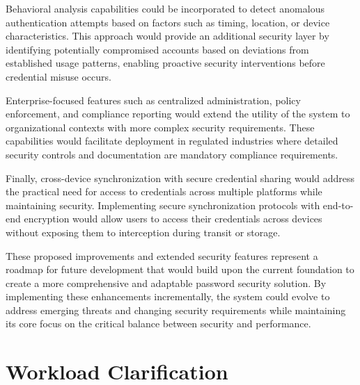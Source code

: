 \documentclass[11pt,a4paper]{article}
\begin{document}
Behavioral analysis capabilities could be incorporated to detect anomalous authentication attempts based on factors such as timing, location, or device characteristics. This approach would provide an additional security layer by identifying potentially compromised accounts based on deviations from established usage patterns, enabling proactive security interventions before credential misuse occurs.

Enterprise-focused features such as centralized administration, policy enforcement, and compliance reporting would extend the utility of the system to organizational contexts with more complex security requirements. These capabilities would facilitate deployment in regulated industries where detailed security controls and documentation are mandatory compliance requirements.

Finally, cross-device synchronization with secure credential sharing would address the practical need for access to credentials across multiple platforms while maintaining security. Implementing secure synchronization protocols with end-to-end encryption would allow users to access their credentials across devices without exposing them to interception during transit or storage.

These proposed improvements and extended security features represent a roadmap for future development that would build upon the current foundation to create a more comprehensive and adaptable password security solution. By implementing these enhancements incrementally, the system could evolve to address emerging threats and changing security requirements while maintaining its core focus on the critical balance between security and performance.
\section{Workload Clarification}
\end{document}
